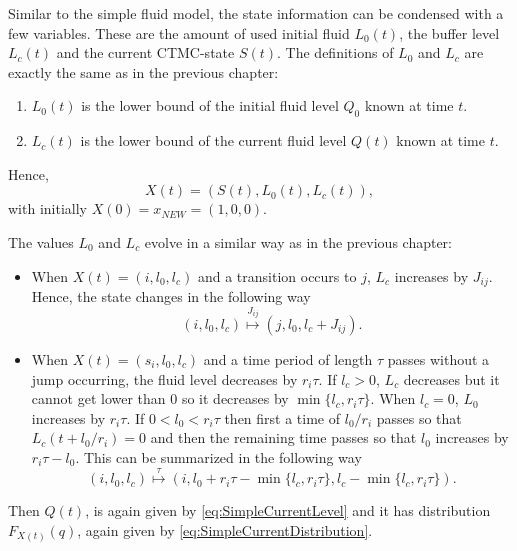 Similar to the simple fluid model, the state information can be condensed with a few variables.
These are the amount of used initial fluid $L_0(t)$, the buffer level $L_c(t)$ and the current CTMC-state $S(t)$.
The definitions of $L_0$ and $L_c$ are exactly the same as in the previous chapter:
\begin{enumerate}
	\item $L_0(t)$ is the lower bound of the initial fluid level $Q_0$ known at time $t$.
	\item $L_c(t)$ is the lower bound of the current fluid level $Q(t)$ known at time $t$.
\end{enumerate}
Hence,
\[
X(t)=(S(t),L_0(t),L_c(t)),
\]
with initially $X(0)=x_{NEW}=(1,0,0)$.

The values $L_0$ and $L_c$ evolve in a similar way as in the previous chapter:
\begin{itemize}
	\item When $X(t)=(i,l_0,l_c)$ and a transition occurs to $j$, $L_c$ increases by $J_{ij}$.
	Hence, the state changes in the following way
	\begin{equation}\label{eq:MmfmJumpEvolution}
	(i,l_0,l_c)\stackrel{J_{ij}}{\mapsto} (j,l_0,l_c+J_{ij}).
	\end{equation}
	\item When $X(t)=(s_i,l_0,l_c)$ and a time period of length $\tau$ passes without a jump occurring, the fluid level decreases by $r_i\tau$.
	If $l_c>0$, $L_c$ decreases but it cannot get lower than $0$ so it decreases by $\min\{l_c,r_i\tau\}$.
	When $l_c=0$, $L_0$ increases by $r_i\tau$.
	If $0<l_0<r_i\tau$ then first a time of $l_0/r_i$ passes so that $L_c(t+l_0/r_i)=0$ and then the remaining time passes so that $l_0$ increases by $r_i\tau-l_0$.
	This can be summarized in the following way
	\begin{equation}\label{eq:MmfmAgeEvolution}
	(i,l_0,l_c)\stackrel\tau\mapsto (i,l_0+r_i\tau-\min\{l_c,r_i\tau\},l_c-\min\{l_c,r_i\tau\}).
	\end{equation}
\end{itemize}
Then $Q(t)$, is again given by \eqref{eq:SimpleCurrentLevel} and it has distribution $F_{X(t)}(q)$,  again given by \eqref{eq:SimpleCurrentDistribution}.

